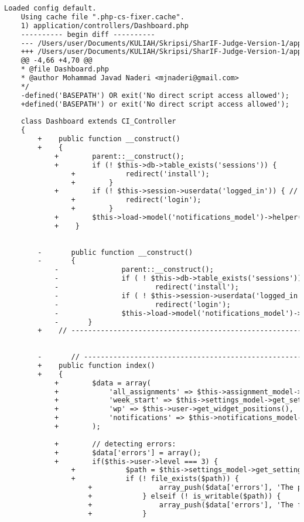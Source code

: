 \begin{lstlisting}[language=diff, caption=Perubahan pada kode Dashboard.php]
	Loaded config default.
	Using cache file ".php-cs-fixer.cache".
	1) application/controllers/Dashboard.php
	---------- begin diff ----------
	--- /Users/user/Documents/KULIAH/Skripsi/SharIF-Judge-Version-1/application/controllers/Dashboard.php
	+++ /Users/user/Documents/KULIAH/Skripsi/SharIF-Judge-Version-1/application/controllers/Dashboard.php
	@@ -4,66 +4,70 @@
	* @file Dashboard.php
	* @author Mohammad Javad Naderi <mjnaderi@gmail.com>
	*/
	-defined('BASEPATH') OR exit('No direct script access allowed');
	+defined('BASEPATH') or exit('No direct script access allowed');
	
	class Dashboard extends CI_Controller
	{
		+    public function __construct()
		+    {
			+        parent::__construct();
			+        if (! $this->db->table_exists('sessions')) {
				+            redirect('install');
				+        }
			+        if (! $this->session->userdata('logged_in')) { // if not logged in
				+            redirect('login');
				+        }
			+        $this->load->model('notifications_model')->helper('text');
			+    }
		
		
		-       public function __construct()
		-       {
			-               parent::__construct();
			-               if ( ! $this->db->table_exists('sessions'))
			-                       redirect('install');
			-               if ( ! $this->session->userdata('logged_in')) // if not logged in
			-                       redirect('login');
			-               $this->load->model('notifications_model')->helper('text');
			-       }
		+    // ------------------------------------------------------------------------
		
		
		-       // ------------------------------------------------------------------------
		+    public function index()
		+    {
			+        $data = array(
			+            'all_assignments' => $this->assignment_model->all_assignments(),
			+            'week_start' => $this->settings_model->get_setting('week_start'),
			+            'wp' => $this->user->get_widget_positions(),
			+            'notifications' => $this->notifications_model->get_latest_notifications()
			+        );
			
			+        // detecting errors:
			+        $data['errors'] = array();
			+        if($this->user->level === 3) {
				+            $path = $this->settings_model->get_setting('assignments_root');
				+            if (! file_exists($path)) {
					+                array_push($data['errors'], 'The path to folder "assignments" is not set correctly. Move this folder somewhere not publicly accessible, and set its full path in Settings.');
					+            } elseif (! is_writable($path)) {
					+                array_push($data['errors'], 'The folder <code>"'.$path.'"</code> is not writable by PHP. Make it writable. But make sure that this folder is only accessible by you. Codes will be saved in this folder!');
					+            }
				

\end{lstlisting}
